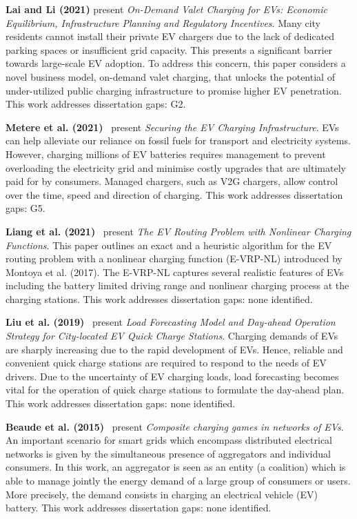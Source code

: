 \documentclass[letterpaper, 12pt, oneside, doublespacing]{Thesis}
\begin{document}
\noindent \textbf{Lai and Li (2021)} present \textit{On-Demand Valet Charging for EVs: Economic Equilibrium, Infrastructure Planning and Regulatory Incentives}. Many city residents cannot install their private EV chargers due to the lack of dedicated parking spaces or insufficient grid capacity. This presents a significant barrier towards large-scale EV adoption. To address this concern, this paper considers a novel business model, on-demand valet charging, that unlocks the potential of under-utilized public charging infrastructure to promise higher EV penetration. This work addresses dissertation gaps: G2.



\noindent \textbf{Metere et al. (2021)}~\cite{securing_the_2021} present \textit{Securing the EV Charging Infrastructure}. EVs can help alleviate our reliance on fossil fuels for transport and electricity systems. However, charging millions of EV batteries requires management to prevent overloading the electricity grid and minimise costly upgrades that are ultimately paid for by consumers. Managed chargers, such as V2G chargers, allow control over the time, speed and direction of charging. This work addresses dissertation gaps: G5.



\noindent \textbf{Liang et al. (2021)}~\cite{the_electric_2021} present \textit{The EV Routing Problem with Nonlinear Charging Functions}. This paper outlines an exact and a heuristic algorithm for the EV routing problem with a nonlinear charging function (E-VRP-NL) introduced by Montoya et al. (2017). The E-VRP-NL captures several realistic features of EVs including the battery limited driving range and nonlinear charging process at the charging stations. This work addresses dissertation gaps: none identified.



\noindent \textbf{Liu et al. (2019)}~\cite{load_forecasting_2019} present \textit{Load Forecasting Model and Day-ahead Operation Strategy for City-located EV Quick Charge Stations}. Charging demands of EVs are sharply increasing due to the rapid development of EVs. Hence, reliable and convenient quick charge stations are required to respond to the needs of EV drivers. Due to the uncertainty of EV charging loads, load forecasting becomes vital for the operation of quick charge stations to formulate the day-ahead plan. This work addresses dissertation gaps: none identified.



\noindent \textbf{Beaude et al. (2015)}~\cite{introducing_decentralized_2015} present \textit{Composite charging games in networks of EVs}. An important scenario for smart grids which encompass distributed electrical networks is given by the simultaneous presence of aggregators and individual consumers. In this work, an aggregator is seen as an entity (a coalition) which is able to manage jointly the energy demand of a large group of consumers or users. More precisely, the demand consists in charging an electrical vehicle (EV) battery. This work addresses dissertation gaps: none identified.
\end{document}
